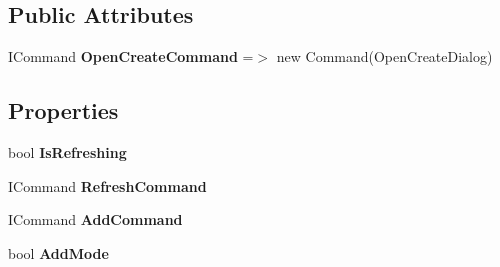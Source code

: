 \subsection*{Public Attributes}
\begin{DoxyCompactItemize}
\item 
\mbox{\label{class_tutor_scout24_1_1_view_models_1_1_message_view_model_a7777d7e7630f8fb45e03b48cb09a069f}} 
I\+Command {\bfseries Open\+Create\+Command} =$>$ new Command(Open\+Create\+Dialog)
\end{DoxyCompactItemize}
\subsection*{Properties}
\begin{DoxyCompactItemize}
\item 
\mbox{\label{class_tutor_scout24_1_1_view_models_1_1_message_view_model_aaa02734e9f69a0117f4be9e884013e22}} 
bool {\bfseries Is\+Refreshing}
\item 
\mbox{\label{class_tutor_scout24_1_1_view_models_1_1_message_view_model_a43736de6d48d9df73a6760bd6b335fcb}} 
I\+Command {\bfseries Refresh\+Command}
\item 
\mbox{\label{class_tutor_scout24_1_1_view_models_1_1_message_view_model_a786cbcde84d47d7e090d423b3a2f9544}} 
I\+Command {\bfseries Add\+Command}
\item 
\mbox{\label{class_tutor_scout24_1_1_view_models_1_1_message_view_model_ac317616e1a372b76d8183d0435b0b11f}} 
bool {\bfseries Add\+Mode}
\item 
\mbox{\label{class_tutor_scout24_1_1_view_models_1_1_message_view_model_a1bad66f58f7ad69a6862cfcd466b54bf}} 

\end{DoxyCompactItemize}
